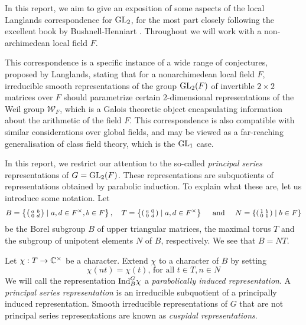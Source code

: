 In this report, we aim to give an exposition of some aspects of the local Langlands correspondence for $\mathrm{GL}_2$, for the most part closely following the excellent book by Bushnell-Henniart \cite{BH1}. Throughout we will work with a non-archimedean local field $F$.

This correspondence is a specific instance of a wide range of conjectures, proposed by Langlands, stating that for a nonarchimedean local field $F$, irreducible smooth representations of the group $\mathrm{GL}_2(F)$ of invertible $2\times 2$ matrices over $F$ should parametrize certain 2-dimensional representations of the Weil group $\mathcal{W}_F$, which is a Galois theoretic object encapsulating information about the arithmetic of the field $F$. This correspondence is also compatible with similar considerations over global fields, and may be viewed as a far-reaching generalisation of class field theory, which is the $\mathrm{GL}_1$ case. 

In this report, we restrict our attention to the so-called \emph{principal series} representations of $G = \mathrm{GL}_2(F)$. These representations are subquotients of representations obtained by parabolic induction. To explain what these are, let us introduce some notation. Let $$B=\left\{\begin{psmallmatrix} a&b\\0&d\end{psmallmatrix} \mid a,d \in F^\times, b \in F\right\},\quad T=\left\{\begin{psmallmatrix}
	a&0\\0&d
\end{psmallmatrix}\mid a,d \in F^\times\right\}\quad\text{ and }\quad N=\left\{\begin{psmallmatrix}
	1&b\\0&1
\end{psmallmatrix}\mid b \in F\right\}$$ be the Borel subgroup $B$ of upper triangular matrices, the maximal torus $T$ and the subgroup of unipotent elements $N$ of $B$, respectively. We see that $B = NT$.
\begin{defn}
	Let $\chi: T\to \mathbb{C}^\times$ be a character. Extend $\chi$ to a character of $B$ by setting
	\[\chi(nt) = \chi(t)\text{, for all } t\in T, n\in N\]
	We will call the representation $\mathrm{Ind}_B^G \chi$ a \emph{parabolically induced representation}. A \emph{principal series representation} is an irreducible subquotient of a principally induced representation. Smooth irreducible representations of $G$ that are not principal series representations are known as \emph{cuspidal representations}.
\end{defn}

